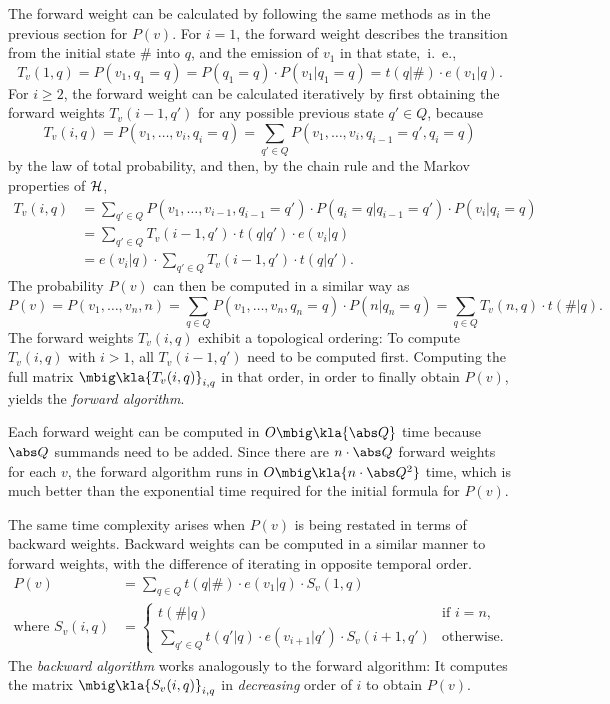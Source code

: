 The forward weight can be calculated by following the same methods as in the
previous section for $P(v)$. For $i = 1$, the forward weight describes the
transition from the initial state $\#$ into $q$, and the emission of $v_1$ in
that state,~i.~e.,
\begin{equation}\label{eq:03-T_v-base}
 T_v(1,q) = P(v_1,q_1=q) = P(q_1=q) \cdot P(v_1|q_1=q) = t(q|\#) \cdot e(v_1|q).
\end{equation}
For $i\geq 2$, the forward weight can be calculated iteratively by first
obtaining the forward weights $T_v(i-1,q')$ for any possible previous state
$q'\in Q$, because
\[
 T_v(i,q) = P(v_1,\ldots,v_i,q_i=q) = \sum_{q'\in Q} P(v_1,\ldots,v_i,q_{i-1}=q',q_i=q)
\]
by the law of total probability, and then, by the chain rule and the Markov
properties of $\mathcal H$,
\begin{align}
 T_v(i,q)
  &= \sum_{q'\in Q} P(v_1,\ldots,v_{i-1},q_{i-1}=q') \cdot P(q_i=q|q_{i-1}=q') \cdot P(v_i|q_i=q) \nonumber\\
  &= \sum_{q'\in Q} T_v(i-1,q') \cdot t(q|q') \cdot e(v_i|q) \nonumber\\
  &= e(v_i|q) \cdot \sum_{q'\in Q} T_v(i-1,q') \cdot t(q|q'). \label{eq:03-T_v}
\end{align}
The probability $P(v)$ can then be computed in a similar way as
\begin{equation}\label{eq:03-p-by-t}
 P(v) = P(v_1,\ldots,v_n,n) = \sum_{q\in Q} P(v_1,\ldots,v_n,q_n=q) \cdot P(n|q_n=q) = \sum_{q\in Q} T_v(n,q) \cdot t(\#|q).
\end{equation}
The forward weights $T_v(i,q)$ exhibit a topological ordering: To compute
$T_v(i,q)$ with $i>1$, all $T_v(i-1,q')$ need to be computed first. Computing
the full matrix $\mbig\kla{T_v(i,q)}_{i,q}$ in that order, in order to finally
obtain $P(v)$, yields the \emph{forward algorithm}.

Each forward weight can be computed in $O\mbig\kla{\abs Q}$ time because $\abs
Q$ summands need to be added. Since there are $n\cdot\abs Q$ forward weights
for each $v$, the forward algorithm runs in $O\mbig\kla{n \cdot \abs Q^2}$
time, which is much better than the exponential time required for the initial
formula for $P(v)$.

The same time complexity arises when $P(v)$ is being restated in terms of
backward weights. Backward weights can be computed in a similar manner to
forward weights, with the difference of iterating in opposite temporal order.
\begin{align}
 P(v) &= \sum_{q\in Q} t(q|\#) \cdot e(v_1|q) \cdot S_v(1,q) \label{eq:03-p-by-s} \\
 \text{where } S_v(i,q) &= \begin{cases}
  t(\#|q) & \text{if }i=n, \\
  \sum_{q'\in Q} t(q'|q) \cdot e(v_{i+1}|q') \cdot S_v(i+1,q') & \text{otherwise}.
 \end{cases} \label{eq:03-S_v}
\end{align}
The \emph{backward algorithm} works analogously to the forward algorithm: It
computes the matrix $\mbig\kla{S_v(i,q)}_{i,q}$ in \emph{decreasing} order of
$i$ to obtain $P(v)$.

